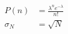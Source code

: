 

\vspace*{\fill}
\centering

\begin{align*}
    P(n) &= \frac{\lambda^{n} e^{-\lambda}}{n!} \\
   \sigma_{N} &= \sqrt{N}
\end{align*}

\centering
\vspace*{\fill}

